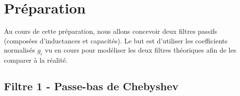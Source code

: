 \addtocounter{section}{1}

\section{Préparation}

\begin{flushleft}
    Au cours de cette préparation, nous allons concevoir deux filtres passifs (composées d'inductances et capacités). Le but est d'utiliser les coefficients normalisés $g_i$ vu en cours pour modéliser les deux filtres théoriques afin de les comparer à la réalité.
\end{flushleft}
\subsection{Filtre 1 - Passe-bas de Chebyshev}
